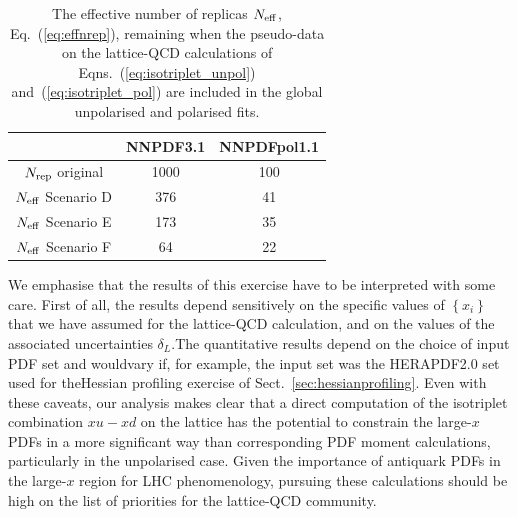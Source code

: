 \begin{table}[h!]
  \centering
  \renewcommand{\arraystretch}{1.3} 
  \begin{tabular}{c|c|c}
    \hline
    &  NNPDF3.1  &  NNPDFpol1.1 \\
    \hline
    \hline
    $N_{\rm rep}$ original   &   1000 &  100   \\
    \hline
     $N_{\rm eff}$ Scenario D    &   376  &  41   \\
     $N_{\rm eff}$ Scenario E    &   173   &   35  \\
     $N_{\rm eff}$ Scenario F   &   64  &   22  \\
    \hline
  \end{tabular}
  \caption{\small The effective number of replicas
    $N_{\rm eff}$, Eq.~(\ref{eq:effnrep}), remaining when the pseudo-data
    on the lattice-QCD calculations
    of Eqns.~(\ref{eq:isotriplet_unpol})
and~(\ref{eq:isotriplet_pol}) 
   are included in the global
    unpolarised and polarised fits. 
    \label{tab:neffxspace}
  }
\end{table}

We emphasise that
the results of this exercise have to be interpreted
with some care.
%
First of all, the results depend sensitively on the specific values of
$\left\{ x_i \right\}$
that we have assumed for the lattice-QCD calculation,
and on the values
of the associated uncertainties $\delta_L$.
%
​The​ ​quantitative​ ​results​ ​depend​ ​on​ ​the​ ​choice​ ​of​ ​input​ ​PDF​ ​set​ ​and​ ​would​ ​vary​ ​if,​ ​for​ ​example,
the​ ​input​ ​set​ ​was​ ​the​ ​HERAPDF2.0​ ​set​ ​used​ ​for​ ​the​ ​Hessian​ ​profiling​ ​exercise​ ​of​ Sect.~\ref{sec:hessianprofiling}.
%
Even with these caveats, our analysis makes clear that a direct
computation of the isotriplet combination $x u-x d$ on the lattice
has the potential to constrain the large-$x$ PDFs in
a more significant way than corresponding PDF moment calculations,
particularly in the unpolarised case.
%
Given the importance of antiquark PDFs in the large-$x$ region for LHC phenomenology,
pursuing these calculations should be high on the list
of priorities for the lattice-QCD community.

